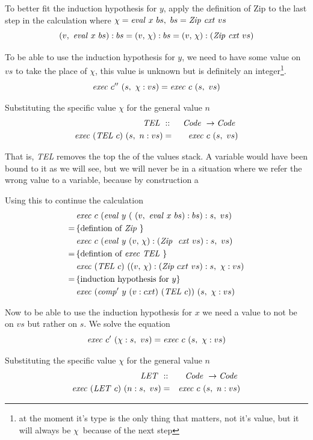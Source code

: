 \documentclass {article}
\begin{document}
To better fit the induction hypothesis for $y$,
apply the definition of Zip to the last step in the calculation
where \( \chi = \mathit{eval\ }  x\ bs,\ bs = \mathit{Zip\ } \mathit{cxt\ } vs \)
\[ (v,\ \mathit{eval\ }  x\ bs) :bs = (v,\, \chi):bs = (v,\, \chi):(\mathit{Zip\ } \mathit{cxt\ } vs) \]

To be able to use the induction hypothesis for $y$,
we need to have some value on $vs$ to take the place of $\chi$,
this value is unknown but is definitely an integer\footnote{
at the moment it's
type is the only thing that matters, not it's value,
but it will always be $\chi$\ because of the next step}.
\[ \Exec c''\ (s,\ \chi : vs) = \Exec c\ (s,\ vs) \]

Substituting the specific value $\chi$ for the general value $n$
\begin{eqnarray*}
\mathit{TEL\ } &::&\ \mathit{Code\ } \rightarrow \mathit{Code\ } \\
\mathit{exec\ } (\mathit{TEL\ } c)\ (s,\ n:vs) &=& \mathit{exec\ } c\ (s,\ vs)
\end{eqnarray*}

That is, \textit{TEL} removes the top the of the values stack.
A variable would have been bound to it as we will see,
but we will never be in a situation where we refer the wrong
value to a variable, because by construction a 

Using this to continue the calculation
\begin{align*}
&\mathit{exec\ } c\ (\mathit{eval\ }  y\ (\ (v,\ \mathit{eval\ }  x\ bs) :bs) : s,\ vs) \\
=\, & \{ \mbox{defintion of}\ \mathit{Zip\ } \} \\
&\mathit{exec\ } c\ (\mathit{eval\ }  y\ (v,\, \chi):(\mathit{Zip\ }\ \mathit{cxt\ } vs) : s,\ vs) \\
=\, & \{ \mbox{defintion of}\ \mathit{exec\ } \mathit{TEL\ } \} \\
&\mathit{exec\ } (\mathit{TEL\ } c)\ ((v,\, \chi):(\mathit{Zip\ } cxt\ vs) : s,\ \chi : vs) \\
=\, & \{ \mbox{induction hypothesis for } y \} \\
&\mathit{exec\ } (\mathit{comp'\ }  y\ (v:cxt)\ (\mathit{TEL\ } c))\ (s,\ \chi : vs)
\end{align*}

Now to be able to use the induction hypothesis for $x$
we need a value to not be on $vs$ but rather on $s$.
We solve the equation 
\[ \Exec c'\ (\chi : s,\ vs) = \Exec c\ (s,\ \chi : vs) \]

Substituting the specific value $\chi$ for the general value $n$
\begin{eqnarray*}
 	\mathit{LET\ } &::&\ \mathit{Code\ } \rightarrow \mathit{Code\ } \\
 	\mathit{exec\ } (\mathit{LET\ } c)\ (n:s,\ vs) &=& \mathit{exec\ } c\ (s,\ n:vs)
\end{eqnarray*}
\end{document}
